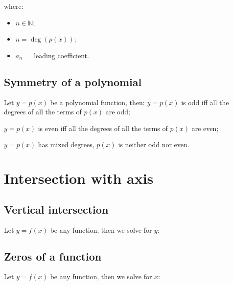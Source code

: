 \documentclass{article}
\begin{document}
where:
\begin{itemize}
    \item $n \in \mathbb{N}$;
    \item $n=\deg(p(x))$;
    \item $a_n=$ leading coefficient.
\end{itemize}


\subsection{Symmetry of a polynomial}
Let $y=p(x)$ be a polynomial function, then:
$y=p(x)$ is odd iff all the degrees of all the terms of
$p(x)$ are odd;

$y=p(x)$ is even iff all the degrees of all the terms of
$p(x)$ are even;

$y=p(x)$ has mixed degrees, $p(x)$ is neither odd nor even.

\newpage
\section{Intersection with axis}
\subsection{Vertical intersection}
Let $y=f(x)$ be any function, then we solve for $y$:

\subsection{Zeros of a function}
Let $y=f(x)$ be any function, then we solve for $x$:
\end{document}
